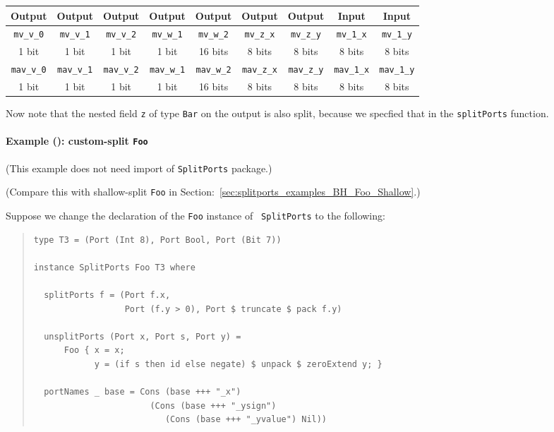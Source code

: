 \begin{tabular}{|c|c|c|c|c|c|c||c|c|}
    \hline
     Output &
     Output &
     Output &
     Output &
     Output &
     Output &
     Output &
     Input  &
     Input  \\
    \hline
     {\tt mv\_v\_0}  &
     {\tt mv\_v\_1}  &
     {\tt mv\_v\_2}  &
     {\tt mv\_w\_1}  &
     {\tt mv\_w\_2}  &
     {\tt mv\_z\_x}  &
     {\tt mv\_z\_y}  &
     {\tt mv\_1\_x}  &
     {\tt mv\_1\_y} \\
      1 bit  &
      1 bit  &
      1 bit  &
      1 bit  &
     16 bits &
      8 bits &
      8 bits &
      8 bits &
      8 bits \\
    \hline
     {\tt mav\_v\_0}  &
     {\tt mav\_v\_1}  &
     {\tt mav\_v\_2}  &
     {\tt mav\_w\_1}  &
     {\tt mav\_w\_2}  &
     {\tt mav\_z\_x}  &
     {\tt mav\_z\_y}  &
     {\tt mav\_1\_x}  &
     {\tt mav\_1\_y} \\
      1 bit  &
      1 bit  &
      1 bit  &
      1 bit  &
     16 bits &
      8 bits &
      8 bits &
      8 bits &
      8 bits \\
    \hline
\end{tabular}

Now note that the nested field {\tt z} of type {\tt Bar} on the output
is also split, because we specfied that in the {\tt splitPorts}
function.


\paragraph{Example (\BH): custom-split {\tt Foo}}

\label{sec:splitports_examples_BH_Custom}

\hspace*{1em}

{\footnotesize (This example does not need import of {\tt SplitPorts} package.)}

(Compare this with shallow-split {\tt Foo} in
Section:~\ref{sec:splitports_examples_BH_Foo_Shallow}.)

Suppose we change the declaration of the {\tt Foo} instance of {\tt
SplitPorts} to the following:

\begin{quote}
\begin{verbatim}
type T3 = (Port (Int 8), Port Bool, Port (Bit 7))

instance SplitPorts Foo T3 where

  splitPorts f = (Port f.x,
                  Port (f.y > 0), Port $ truncate $ pack f.y)

  unsplitPorts (Port x, Port s, Port y) =
      Foo { x = x;
            y = (if s then id else negate) $ unpack $ zeroExtend y; }

  portNames _ base = Cons (base +++ "_x")
                       (Cons (base +++ "_ysign")
                          (Cons (base +++ "_yvalue") Nil))
\end{verbatim}
\end{quote}

